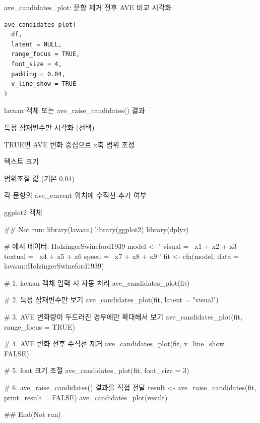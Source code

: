 \documentclass[a4paper]{book}
\begin{document}
%
\begin{Description}
ave\_candidates\_plot: 문항 제거 전후 AVE 비교 시각화
\end{Description}
%
\begin{Usage}
\begin{verbatim}
ave_candidates_plot(
  df,
  latent = NULL,
  range_focus = TRUE,
  font_size = 4,
  padding = 0.04,
  v_line_show = TRUE
)
\end{verbatim}
\end{Usage}
%
\begin{Arguments}
\begin{ldescription}
\item[\code{df}] lavaan 객체 또는 ave\_raise\_candidates() 결과

\item[\code{latent}] 특정 잠재변수만 시각화 (선택)

\item[\code{range\_focus}] TRUE면 AVE 변화 중심으로 x축 범위 조정

\item[\code{font\_size}] 텍스트 크기

\item[\code{padding}] 범위조절 값 (기본 0.04)

\item[\code{v\_line\_show}] 각 문항의 ave\_current 위치에 수직선 추가 여부
\end{ldescription}
\end{Arguments}
%
\begin{Value}
ggplot2 객체
\end{Value}
%
\begin{Examples}
\begin{ExampleCode}
\#\# Not run: 
library(lavaan)
library(ggplot2)
library(dplyr)

# 예시 데이터: HolzingerSwineford1939
model <- '
  visual  =~ x1 + x2 + x3
  textual =~ x4 + x5 + x6
  speed   =~ x7 + x8 + x9
'
fit <- cfa(model, data = lavaan::HolzingerSwineford1939)

# 1. lavaan 객체 입력 시 자동 처리
ave_candidates_plot(fit)

# 2. 특정 잠재변수만 보기
ave_candidates_plot(fit, latent = "visual")

# 3. AVE 변화량이 두드러진 경우에만 확대해서 보기
ave_candidates_plot(fit, range_focus = TRUE)

# 4. AVE 변화 전후 수직선 제거
ave_candidates_plot(fit, v_line_show = FALSE)

# 5. font 크기 조절
ave_candidates_plot(fit, font_size = 3)

# 6. ave_raise_candidates() 결과를 직접 전달
result <- ave_raise_candidates(fit, print_result = FALSE)
ave_candidates_plot(result)

## End(Not run)
\end{ExampleCode}
\end{Examples}
\end{document}
